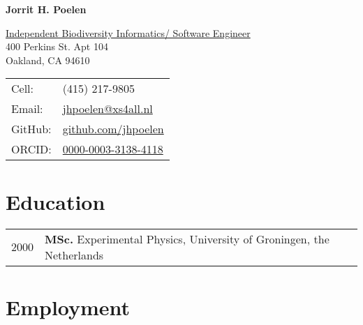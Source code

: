 \documentclass[11pt,fullpage]{article}
\def\name{Jorrit H. Poelen}
\begin{document}


\centerline{\Large \bf \name}

\vspace{0.25in}

\begin{minipage}{0.60\linewidth}
  \href{http://www.linkedin.com/in/jhpoelen/}{Independent Biodiversity Informatics/ Software Engineer} \\
  400 Perkins St. Apt 104 \\
  Oakland, CA 94610
\end{minipage}
\begin{minipage}{0.40\linewidth}
  \begin{tabular}{ll}
    Cell: & (415) 217-9805 \\
    Email: & \href{mailto:jhpoelen@xs4all.nl}{jhpoelen@xs4all.nl} \\
    GitHub: & \href{http://github.com/jhpoelen}{github.com/jhpoelen} \\
    ORCID: & \href{http://orcid.org/0000-0003-3138-4118}{0000-0003-3138-4118} \\
  \end{tabular}
\end{minipage}

\hrulefill

\section*{Education}

\begin{tabular}{ll}
	2000 & {\bf MSc.} Experimental Physics, University of Groningen, the Netherlands \\
\end{tabular}

\section*{Employment}

\end{document}

